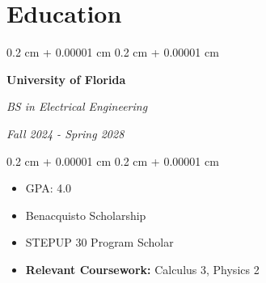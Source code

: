 \documentclass[10pt, letterpaper]{article}
\newenvironment{highlights}{
    \begin{itemize}[
        topsep=0.10 cm,
        parsep=0.10 cm,
        partopsep=0pt,
        itemsep=0pt,
        leftmargin=0.4 cm + 10pt
    ]
}{
    \end{itemize}
} %
\newenvironment{highlightsforbulletentries}{
    \begin{itemize}[
        topsep=0.10 cm,
        parsep=0.10 cm,
        partopsep=0pt,
        itemsep=0pt,
        leftmargin=10pt
    ]
}{
    \end{itemize}
} %
\newenvironment{onecolentry}{
    \begin{adjustwidth}{
        0.2 cm + 0.00001 cm
    }{
        0.2 cm + 0.00001 cm
    }
}{
    \end{adjustwidth}
} %
\newenvironment{twocolentry}[2][]{
    \onecolentry
    \def\secondColumn{#2}
    \setcolumnwidth{\fill, 4.5 cm}
    \begin{paracol}{2}
}{
    \switchcolumn \raggedleft \secondColumn
    \end{paracol}
    \endonecolentry
} %
\let\hrefWithoutArrow\href
\renewcommand{\href}[2]{\hrefWithoutArrow{#1}{\ifthenelse{\equal{#2}{}}{ }{#2 }\raisebox{.15ex}{\footnotesize \faExternalLink*}}}
\begin{document}



    









    \section{Education}
        \begin{twocolentry}{            
        \textit{Fall 2024 - Spring 2028}}
            \textbf{University of Florida}

            \textit{BS in Electrical Engineering}
        \end{twocolentry}

        \vspace{0.10 cm}
        \begin{onecolentry}
            \begin{highlights}
                \item GPA: 4.0
                \item Benacquisto Scholarship
                \item STEPUP 30 Program Scholar 
                \item \textbf{Relevant Coursework:} Calculus 3, Physics 2 
            \end{highlights}
        \end{onecolentry}
\end{document}
